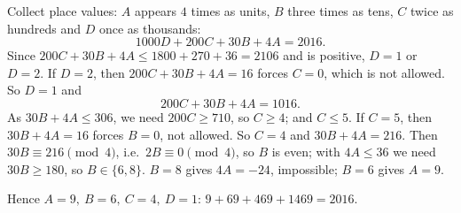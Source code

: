 Collect place values: $A$ appears $4$ times as units, $B$ three times as tens, $C$ twice as hundreds and $D$ once as thousands:
\[
1000D+200C+30B+4A=2016 .
\]
Since $200C+30B+4A\le1800+270+36=2106$ and is positive, $D=1$ or $D=2$. If $D=2$, then $200C+30B+4A=16$ forces $C=0$, which is not allowed. So $D=1$ and
\[
200C+30B+4A=1016.
\]
As $30B+4A\le306$, we need $200C\ge710$, so $C\ge4$; and $C\le5$. If $C=5$, then $30B+4A=16$ forces $B=0$, not allowed. So $C=4$ and $30B+4A=216$. Then $30B\equiv216\pmod 4$, i.e.\ $2B\equiv0\pmod4$, so $B$ is even; with $4A\le36$ we need $30B\ge180$, so $B\in\{6,8\}$. $B=8$ gives $4A=-24$, impossible; $B=6$ gives $A=9$.

Hence $\boxed{A=9,\ B=6,\ C=4,\ D=1}$: $9+69+469+1469=2016$.
